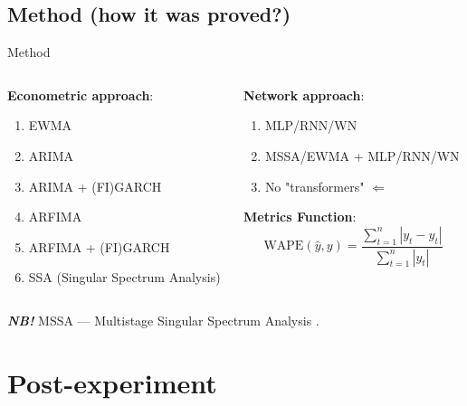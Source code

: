 \documentclass[11pt, aspectratio= 169]{beamer}
\begin{document}
	
	\subsection{Method (how it was proved?)}
	\begin{frame}{Method}
		\begin{columns}
			\begin{column}{0.5\textwidth}
				\textbf{Econometric approach}:
				\begin{center}
					\begin{enumerate}
						\item EWMA
						\item ARIMA
						\item ARIMA + (FI)GARCH
						\item ARFIMA
						\item ARFIMA + (FI)GARCH
						\item SSA (Singular Spectrum Analysis)
					\end{enumerate}
				\end{center}
			\end{column}
			\hfill
			\begin{column}{0.5\textwidth}
				\textbf{Network approach}:
				\begin{center}
					\begin{enumerate}
						\item MLP/RNN/WN
						\item MSSA/EWMA + MLP/RNN/WN
						\item No "transformers" $\Leftarrow$ \cite{zeng2022transformers}
					\end{enumerate}
				\end{center}
				\textbf{Metrics Function}:
				\begin{equation}
					\text{WAPE}(\hat{y}, y) = \frac{\sum_{t= 1}^n |y_t - \hat{y}_t|}{\sum_{t= 1}^n |y_t|}
				\end{equation}
			\end{column}
		\end{columns}
		\vspace{1cm}
		\textbf{\textit{NB!}} MSSA --- Multistage Singular Spectrum Analysis \cite{kuang2020efficient}.
	\end{frame}
	
	\section{Post-experiment}
\end{document}
